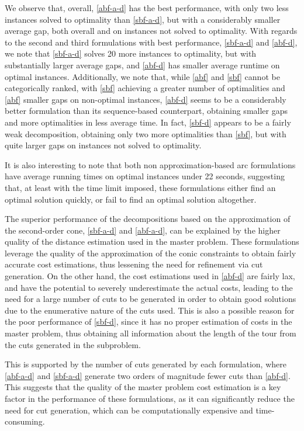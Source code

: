 \documentclass[pdflatex,sn-mathphys-num]{sn-jnl}%
\begin{document}
We observe that, overall, \ref{abf-a-d} has the best performance, with only two less instances solved to optimality than \ref{sbf-a-d}, but with a considerably smaller average gap, both overall and on instances not solved to optimality. With regards to the second and third formulations with best performance, \ref{sbf-a-d} and \ref{abf-d}, we note that \ref{sbf-a-d} solves 20 more instances to optimality, but with substantially larger average gaps, and \ref{abf-d} has smaller average runtime on optimal instances. Additionally, we note that, while \ref{abf} and \ref{sbf} cannot be categorically ranked, with \ref{sbf} achieving a greater number of optimalities and \ref{abf} smaller gaps on non-optimal instances, \ref{abf-d} seems to be a considerably better formulation than its sequence-based counterpart, obtaining smaller gaps and more optimalities in less average time. In fact, \ref{sbf-d} appears to be a fairly weak decomposition, obtaining only two more optimalities than \ref{sbf}, but with quite larger gaps on instances not solved to optimality.

It is also interesting to note that both non approximation-based arc formulations have average running times on optimal instances under 22 seconds, suggesting that, at least with the time limit imposed, these formulations either find an optimal solution quickly, or fail to find an optimal solution altogether. 

The superior performance of the decompositions based on the approximation of the second-order cone, \ref{sbf-a-d} and \ref{abf-a-d}, can be explained by the higher quality of the distance estimation used in the master problem. These formulations leverage the quality of the approximation of the conic constraints to obtain fairly accurate cost estimations, thus lessening the need for refinement via cut generation. On the other hand, the cost estimations used in \ref{abf-d} are fairly lax, and have the potential to severely underestimate the actual costs, leading to the need for a large number of cuts to be generated in order to obtain good solutions due to the enumerative nature of the cuts used. This is also a possible reason for the poor performance of \ref{sbf-d}, since it has no proper estimation of costs in the master problem, thus obtaining all information about the length of the tour from the cuts generated in the subproblem.

This is supported by the number of cuts generated by each formulation, where \ref{abf-a-d} and \ref{sbf-a-d} generate two orders of magnitude fewer cuts than \ref{abf-d}. This suggests that the quality of the master problem cost estimation is a key factor in the performance of these formulations, as it can significantly reduce the need for cut generation, which can be computationally expensive and time-consuming.
\end{document}
